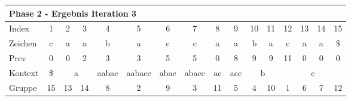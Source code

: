\begin{table}[H]
\centering
\begin{adjustbox}{max width=\textwidth}
\centering
\begin{tabular}{lccccccccccccccc}
\multicolumn{16}{l}{Phase 2 - Ergebnis Iteration 3}                                                                                                                                                                                                                                                                                                                                                                                \\ \hline
\multicolumn{1}{l|}{Index}   & 1                       & 2  & 3                                               & 4                                              & 5                           & 6                                              & 7                          & 8                                               & 9                        & 10 & 11                      & 12                         & 13 & 14 & 15 \\
\multicolumn{1}{l|}{Zeichen} & c                       & a  & a                                               & b                                              & a                           & c                                              & c                          & a                                               & a                        & b  & a                       & c                          & a  & a  & \$ \\
\multicolumn{1}{l|}{Prev}    & 0                       & 0  & 2                                               & 3                                              & 3                           & 5                                              & 5                          & 0                                               & 8                        & 9  & 9                       & 11                         & 0  & 0  & 0  \\ \hline
\multicolumn{1}{l|}{Kontext} & \multicolumn{1}{c|}{\$} & \multicolumn{2}{c|}{a}                               & \multicolumn{1}{c|}{aabac}                     & \multicolumn{1}{c|}{aabacc} & \multicolumn{1}{c|}{abac}                      & \multicolumn{1}{c|}{abacc} & \multicolumn{1}{c|}{ac}                         & \multicolumn{1}{c|}{acc} & \multicolumn{2}{c|}{b}       & \multicolumn{4}{c}{c}                     \\
\multicolumn{1}{l|}{Gruppe}  & \multicolumn{1}{c|}{15} & 13 & \multicolumn{1}{c|}{14}                         & \multicolumn{1}{c|}{8}                         & \multicolumn{1}{c|}{2}      & \multicolumn{1}{c|}{9}                         & \multicolumn{1}{c|}{3}     & \multicolumn{1}{c|}{11}                         & \multicolumn{1}{c|}{5}   & 4  & \multicolumn{1}{c|}{10} & 1                          & 6  & 7  & 12 \\

\end{tabular}
\end{adjustbox}
\end{table}
